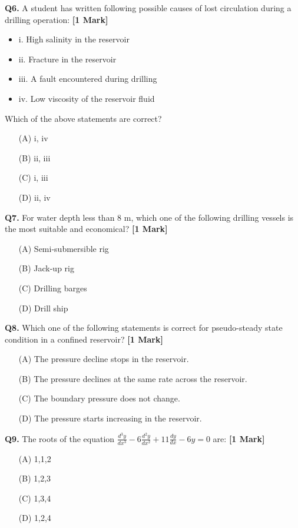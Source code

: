 \documentclass[11pt]{article}
\newcommand{\questiona}[2]{
    \noindent\textbf{Q#2.} #1 \hfill \textbf{[1 Mark]}
}
\begin{document}
\questiona{A student has written following possible causes of lost circulation during a drilling operation:}{6}
\begin{itemize}
    \item i. High salinity in the reservoir  
    \item ii. Fracture in the reservoir  
    \item iii. A fault encountered during drilling  
    \item iv. Low viscosity of the reservoir fluid  
\end{itemize}
Which of the above statements are correct?  
\begin{enumerate}
    \item[(A)] i, iv  
    \item[(B)] ii, iii  
    \item[(C)] i, iii  
    \item[(D)] ii, iv  
\end{enumerate}
\vspace{0.5cm}

\questiona{For water depth less than 8 m, which one of the following drilling vessels is the most suitable and economical?}{7}
\begin{enumerate}
    \item[(A)] Semi-submersible rig  
    \item[(B)] Jack-up rig  
    \item[(C)] Drilling barges  
    \item[(D)] Drill ship  
\end{enumerate}
\vspace{0.5cm}

\questiona{Which one of the following statements is correct for pseudo-steady state condition in a confined reservoir?}{8}
\begin{enumerate}
    \item[(A)] The pressure decline stops in the reservoir.  
    \item[(B)] The pressure declines at the same rate across the reservoir.  
    \item[(C)] The boundary pressure does not change.  
    \item[(D)] The pressure starts increasing in the reservoir.  
\end{enumerate}
\vspace{0.5cm}

\questiona{The roots of the equation \(\frac{d^3 y}{dx^3} - 6 \frac{d^2 y}{dx^2} + 11 \frac{dy}{dx} - 6y = 0\) are:}{9}
\begin{enumerate}
    \item[(A)] 1,1,2  
    \item[(B)] 1,2,3  
    \item[(C)] 1,3,4  
    \item[(D)] 1,2,4  
\end{enumerate}
\vspace{0.5cm}
\end{document}
